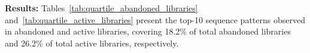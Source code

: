 
\noindent \textbf{Results:} Tables~\ref{tab:quartile_abandoned_libraries} and~\ref{tab:quartile_active_libraries} present the top-10 sequence patterns observed in abandoned and active libraries, covering 18.2\% of total abandoned libraries and 26.2\% of total active libraries, respectively.



